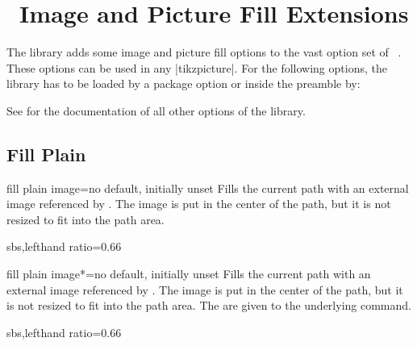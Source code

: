 \clearpage
\section{\tikzname\ Image and Picture Fill Extensions}\label{sec:tikzimagefilling}
The  library adds some image and picture fill options to the vast option set of
\tikzname\ \cite{tantau:2013a}. These options can be used in any |tikzpicture|.
For the following options, the  library has to be loaded
by a package option or inside the preamble by:
\begin{dispListing}
\end{dispListing}

See  for the documentation of all other options of the  library.

\subsection{Fill Plain}
\begin{docTikzKey}{fill plain image}{=}{no default, initially unset}
  Fills the current path with an external image referenced by .
  The image is put in the center of the path, but it is not resized to fit into
  the path area.
\begin{dispExample*}{sbs,lefthand ratio=0.66}
\end{dispExample*}
\end{docTikzKey}


\begin{docTikzKey}{fill plain image*}{=}{no default, initially unset}
  Fills the current path with an external image referenced by .
  The image is put in the center of the path, but it is not resized to fit into
  the path area.
  The  are given to the underlying  command.
\begin{dispExample*}{sbs,lefthand ratio=0.66}
\end{dispExample*}
\end{docTikzKey}


